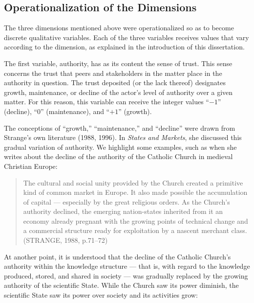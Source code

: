 \subsection{Operationalization of the Dimensions}

The three dimensions mentioned above were operationalized so as to become discrete qualitative variables. Each of the three variables receives values that vary according to the dimension, as explained in the introduction of this dissertation.

The first variable, authority, has as its content the sense of trust. This sense concerns the trust that peers and stakeholders in the matter place in the authority in question. The trust deposited (or the lack thereof) designates growth, maintenance, or decline of the actor's level of authority over a given matter. For this reason, this variable can receive the integer values ``$-1$'' (decline), ``$0$'' (maintenance), and ``$+1$'' (growth).

The conceptions of ``growth,'' ``maintenance,'' and ``decline'' were drawn from Strange's own literature (1988, 1996). In \textit{States and Markets}, she discussed this gradual variation of authority. We highlight some examples, such as when she writes about the decline of the authority of the Catholic Church in medieval Christian Europe:

\begin{quote}
The cultural and social unity provided by the Church created a primitive kind of common market in Europe. It also made possible the accumulation of capital --- especially by the great religious orders. As the Church's authority declined, the emerging nation-states inherited from it an economy already pregnant with the growing points of technical change and a commercial structure ready for exploitation by a nascent merchant class. (STRANGE, 1988, p.71--72)
\end{quote}

At another point, it is understood that the decline of the Catholic Church's authority within the knowledge structure --- that is, with regard to the knowledge produced, stored, and shared in society --- was gradually replaced by the growing authority of the scientific State. While the Church saw its power diminish, the scientific State saw its power over society and its activities grow:

